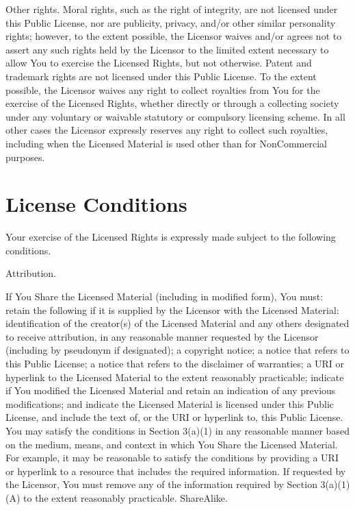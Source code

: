     Other rights.
        Moral rights, such as the right of integrity, are not licensed under this Public License, nor are publicity, privacy, and/or other similar personality rights; however, to the extent possible, the Licensor waives and/or agrees not to assert any such rights held by the Licensor to the limited extent necessary to allow You to exercise the Licensed Rights, but not otherwise.
        Patent and trademark rights are not licensed under this Public License.
        To the extent possible, the Licensor waives any right to collect royalties from You for the exercise of the Licensed Rights, whether directly or through a collecting society under any voluntary or waivable statutory or compulsory licensing scheme. In all other cases the Licensor expressly reserves any right to collect such royalties, including when the Licensed Material is used other than for NonCommercial purposes.

\section*{License Conditions}

Your exercise of the Licensed Rights is expressly made subject to the following conditions.

    Attribution.

        If You Share the Licensed Material (including in modified form), You must:
            retain the following if it is supplied by the Licensor with the Licensed Material:
                identification of the creator(s) of the Licensed Material and any others designated to receive attribution, in any reasonable manner requested by the Licensor (including by pseudonym if designated);
                a copyright notice;
                a notice that refers to this Public License;
                a notice that refers to the disclaimer of warranties;
                a URI or hyperlink to the Licensed Material to the extent reasonably practicable;
            indicate if You modified the Licensed Material and retain an indication of any previous modifications; and
            indicate the Licensed Material is licensed under this Public License, and include the text of, or the URI or hyperlink to, this Public License.
        You may satisfy the conditions in Section 3(a)(1) in any reasonable manner based on the medium, means, and context in which You Share the Licensed Material. For example, it may be reasonable to satisfy the conditions by providing a URI or hyperlink to a resource that includes the required information.
        If requested by the Licensor, You must remove any of the information required by Section 3(a)(1)(A) to the extent reasonably practicable.
    ShareAlike.

